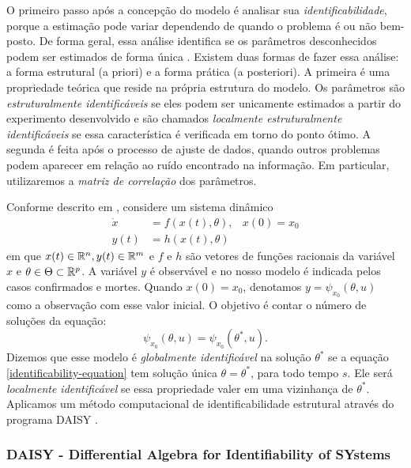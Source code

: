 O primeiro passo após a concepção do modelo é analisar sua {\em identificabilidade}, porque a estimação pode variar dependendo de quando o problema é ou não bem-posto. 
De forma geral, essa análise identifica se os parâmetros desconhecidos podem ser estimados de forma única \cite{audoly2001, sarcomani2019}. 
Existem duas formas de fazer essa análise: a forma estrutural (a priori) e a forma prática (a posteriori). 
A primeira é uma propriedade teórica que reside na própria estrutura do modelo. Os parâmetros são {\em estruturalmente identificáveis} se eles podem ser unicamente estimados a partir do experimento desenvolvido e são chamados {\em localmente estruturalmente identificáveis} se essa característica é verificada em torno do ponto ótimo. 
A segunda é feita após o processo de ajuste de dados, quando outros problemas podem aparecer em relação ao ruído encontrado na informação. Em particular, utilizaremos a {\em matriz de correlação} dos parâmetros.

Conforme descrito em \cite{ljung1994}, considere um sistema dinâmico
\begin{equation}
    \begin{aligned}
        \Dot{x} &= f(x(t), \theta), &x(0) = x_0 \\
        y(t) &= h(x(t), \theta)
    \end{aligned}
\end{equation}
em que $x(t) \in \mathbb{R}^n, y(t) \in \mathbb{R}^m$ e $f$ e $h$ são vetores de funções racionais da variável $x$ e $\theta \in \Theta \subset \mathbb{R}^p$. 
A variável $y$ é observável e no nosso modelo é indicada pelos casos confirmados e mortes. 
Quando $x(0) = x_0$, denotamos $y = \psi_{x_0}(\theta, u)$ como a observação com esse valor inicial. 
O objetivo é contar o número de soluções da equação:
\begin{equation}
     \label{identificability-equation}
     \psi_{x_0}(\theta, u) =  \psi_{x_0}(\theta^*, u).
\end{equation}
Dizemos que esse modelo é {\em globalmente identificável} na solução $\theta ^*$ se a equação \eqref{identificability-equation} tem solução única $\theta = \theta^*$, para todo tempo $s$. 
Ele será {\em localmente identificável} se essa propriedade valer em uma vizinhança de $\theta ^*$. Aplicamos um método computacional de identificabilidade estrutural através do programa DAISY \cite{bellu2007}.

\subsubsection{DAISY - Differential Algebra for Identifiability of SYstems}

